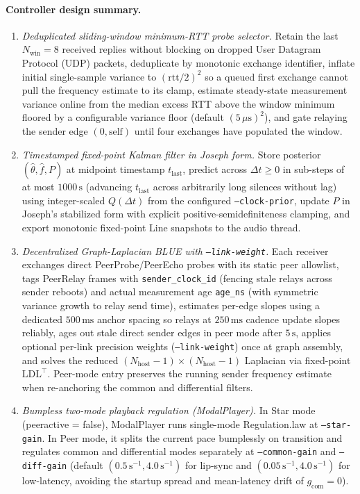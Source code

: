 \documentclass[11pt,a4paper]{article}
\DeclareRobustCommand{\lean}[1]{{\ttfamily\def\_{\textunderscore\allowbreak}#1}}
\theoremstyle{definition}
\begin{document}
\paragraph{Controller design summary.}
\begin{enumerate}
\item \emph{Deduplicated sliding-window minimum-RTT probe selector.} Retain the
  last $N_{\mathrm{win}} = 8$ received replies without blocking on dropped User
  Datagram Protocol (UDP) packets, deduplicate by monotonic exchange identifier,
  inflate initial single-sample variance to $(\mathrm{rtt}/2)^2$ so a queued
  first exchange cannot pull the frequency estimate to its clamp, estimate
  steady-state measurement variance online from the median excess RTT above the
  window minimum floored by a configurable variance floor (default
  $(5\,\mu\text{s})^2$), and gate relaying the sender edge $(0, \text{self})$
  until four exchanges have populated the window.
\item \emph{Timestamped fixed-point Kalman filter in Joseph form.} Store
  posterior $(\hat\theta, \hat f, P)$ at midpoint timestamp $t_{\mathrm{last}}$,
  predict across $\Delta t \ge 0$ in sub-steps of at most $1000\,\text{s}$
  (advancing $t_{\mathrm{last}}$ across arbitrarily long silences without lag)
  using integer-scaled $Q(\Delta t)$ from the configured \texttt{--clock-prior},
  update $P$ in Joseph's stabilized form \cite{bucy1968} with explicit
  positive-semidefiniteness clamping, and export monotonic fixed-point
  \lean{Line} snapshots to the audio thread.
\item \emph{Decentralized Graph-Laplacian BLUE with \texttt{--link-weight}.}
  Each receiver exchanges direct \lean{PeerProbe}/\lean{PeerEcho} probes with
  its static peer allowlist, tags \lean{PeerRelay} frames with
  \texttt{sender\_clock\_id} (fencing stale relays across sender reboots) and
  actual measurement age \texttt{age\_ns} (with symmetric variance growth to
  relay send time), estimates per-edge slopes using a dedicated $500\,\text{ms}$
  anchor spacing so relays at $250\,\text{ms}$ cadence update slopes reliably,
  ages out stale direct sender edges in peer mode after $5\,\text{s}$, applies
  optional per-link precision weights (\texttt{--link-weight}) once at graph
  assembly, and solves the reduced
  $(N_{\mathrm{host}}{-}1)\times(N_{\mathrm{host}}{-}1)$ Laplacian via
  fixed-point $\mathrm{LDL}^\top$. Peer-mode entry preserves the running
  sender frequency estimate when re-anchoring the common and differential
  filters.
\item \emph{Bumpless two-mode playback regulation (\lean{ModalPlayer}).}
  In Star mode (\lean{peer\_active = false}), \lean{ModalPlayer} runs
  single-mode \lean{Regulation.law} at \texttt{--star-gain}. In Peer mode, it
  splits the current pace bumplessly on transition and regulates common and
  differential modes separately at \texttt{--common-gain} and
  \texttt{--diff-gain} (default $(0.5\,\text{s}^{-1}, 4.0\,\text{s}^{-1})$ for
  lip-sync and $(0.05\,\text{s}^{-1}, 4.0\,\text{s}^{-1})$ for low-latency,
  avoiding the startup spread and mean-latency drift of $g_{\mathrm{com}} = 0$).
\end{enumerate}
\end{document}
